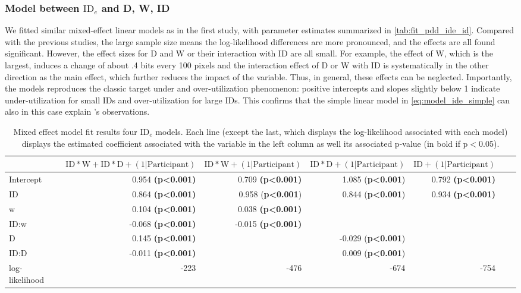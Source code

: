 \documentclass[acmlarge, manuscript,review]{acmart}
\newcommand{\ide}{\ensuremath{{\text{ID}_e}}\xspace}
\newcommand{\D}{\ensuremath{{\text{D}}}\xspace}
\newcommand{\W}{\ensuremath{{\text{W}}}\xspace}
\begin{document}
\subsubsection{Model between \ide and D, W, ID}
We fitted similar mixed-effect linear models as in the first study, with parameter estimates summarized in \autoref{tab:fit_pdd_ide_id}. Compared with the previous studies, the large sample size means the log-likelihood differences are more pronounced, and the effects are all found significant. However, the effect sizes for D and W or their interaction with ID are all small. For example, the effect of W, which is the largest, induces a change of about .4 bits every 100 pixels and the interaction effect of D or W with ID is systematically in the other direction as the main effect, which further reduces the impact of the variable. Thus, in general, these effects can be neglected.
Importantly, the models reproduces the classic target under and over-utilization phenomenon: positive intercepts and slopes slightly below 1 indicate under-utilization for small IDs and over-utilization for large IDs. This confirms that the simple linear model in \autoref{eq:model_ide_simple} can also in this case explain \citeauthor{zhai2004nominal}'s observations. 

\begin{table}
	\caption{Mixed effect model fit results four \ide models. Each line (except the last, which displays the log-likelihood associated with each model) displays the estimated coefficient associated with the variable in the left column as well its associated p-value (in bold if p$<$0.05).}
	\label{tab:fit_pdd_ide_id}
\begin{center}
	\begin{tabular}{lrrrrrr}
	\hline
			  &  $\text{ID}*\W + \text{ID}*\D + (1|\text{Participant})$ & $\text{ID}*\W + (1|\text{Participant})$ &  $ \text{ID}*\D + (1|\text{Participant})$ & $\text{ID}+ (1|\text{Participant})$  \\
	\hline
	Intercept &  0.954 \textbf{(p\textless0.001)} &    				0.709 \textbf{(p\textless0.001)} & 1.085 (\textbf{p\textless0.001})  & 0.792 \textbf{(p\textless0.001)} \\
	ID        &  0.864 \textbf{(p\textless0.001)} &    0.958 (\textbf{p\textless0.001}) &  0.844 (\textbf{p\textless0.001}) & 0.934 \textbf{(p\textless0.001)}  \\
	w         & 0.104 \textbf{(p\textless0.001)} & 0.038 \textbf{(p\textless0.001)}    &   & \\
	ID:w      & -0.068 \textbf{(p\textless0.001)} &    -0.015 \textbf{(p\textless0.001)}  &   & \\
	D         &  0.145 \textbf{(p\textless0.001)} &    &  -0.029 (\textbf{p\textless0.001})  & \\
	ID:D      & -0.011 \textbf{(p\textless0.001)} &     & 0.009 (\textbf{p\textless0.001})   & \\
	log-likelihood & -223 & -476 & -674  & -754\\
	\hline
	\end{tabular}
	\end{center}
	\end{table}
\end{document}
